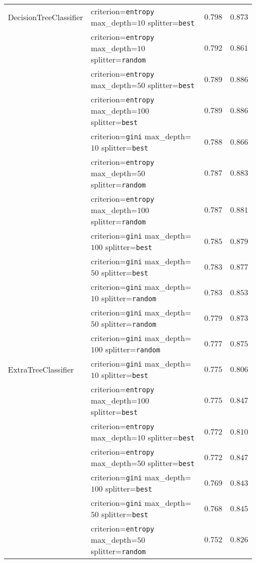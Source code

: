 \begin{longtable}{llrr}
\bottomrule
\endlastfoot
DecisionTreeClassifier & \tiny{criterion=\texttt{entropy} max\_depth=$10$ splitter=\texttt{best}} &$0.798$ & $0.873$\\
& \tiny{criterion=\texttt{entropy} max\_depth=$10$ splitter=\texttt{random}} &$0.792$ & $0.861$\\
& \tiny{criterion=\texttt{entropy} max\_depth=$50$ splitter=\texttt{best}} &$0.789$ & $0.886$\\
& \tiny{criterion=\texttt{entropy} max\_depth=$100$ splitter=\texttt{best}} &$0.789$ & $0.886$\\
& \tiny{criterion=\texttt{gini} max\_depth=$10$ splitter=\texttt{best}} &$0.788$ & $0.866$\\
& \tiny{criterion=\texttt{entropy} max\_depth=$50$ splitter=\texttt{random}} &$0.787$ & $0.883$\\
& \tiny{criterion=\texttt{entropy} max\_depth=$100$ splitter=\texttt{random}} &$0.787$ & $0.881$\\
& \tiny{criterion=\texttt{gini} max\_depth=$100$ splitter=\texttt{best}} &$0.785$ & $0.879$\\
& \tiny{criterion=\texttt{gini} max\_depth=$50$ splitter=\texttt{best}} &$0.783$ & $0.877$\\
& \tiny{criterion=\texttt{gini} max\_depth=$10$ splitter=\texttt{random}} &$0.783$ & $0.853$\\
& \tiny{criterion=\texttt{gini} max\_depth=$50$ splitter=\texttt{random}} &$0.779$ & $0.873$\\
& \tiny{criterion=\texttt{gini} max\_depth=$100$ splitter=\texttt{random}} &$0.777$ & $0.875$\\
\midrule
ExtraTreeClassifier & \tiny{criterion=\texttt{gini} max\_depth=$10$ splitter=\texttt{best}} &$0.775$ & $0.806$\\
& \tiny{criterion=\texttt{entropy} max\_depth=$100$ splitter=\texttt{best}} &$0.775$ & $0.847$\\
& \tiny{criterion=\texttt{entropy} max\_depth=$10$ splitter=\texttt{best}} &$0.772$ & $0.810$\\
& \tiny{criterion=\texttt{entropy} max\_depth=$50$ splitter=\texttt{best}} &$0.772$ & $0.847$\\
& \tiny{criterion=\texttt{gini} max\_depth=$100$ splitter=\texttt{best}} &$0.769$ & $0.843$\\
& \tiny{criterion=\texttt{gini} max\_depth=$50$ splitter=\texttt{best}} &$0.768$ & $0.845$\\
& \tiny{criterion=\texttt{entropy} max\_depth=$50$ splitter=\texttt{random}} &$0.752$ & $0.826$\\

\end{longtable}
